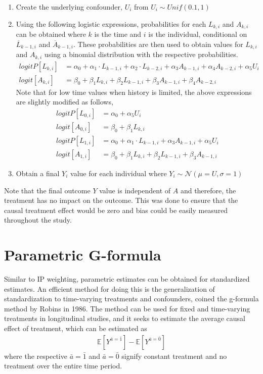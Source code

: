 \begin{enumerate}
\item Create the underlying confounder, $U_i$ from $U_i \sim Unif(0.1, 1)$ 
\item Using the following logistic expressions, probabilities for each $L_{k,i}$ and $A_{k,i}$ can be obtained where $k$ is the time and $i$ is the individual, conditional on $\overline{L}_{k-1,i}$ and $\overline{A}_{k-1,i}$.  These probabilities are then used to obtain values for $L_{k,i}$ and $A_{k,i}$ using a binomial distribution with the respective probabilities.  
\begin{align} 
logitP[L_{k,i}] &= \alpha_0 + \alpha_1 \cdot L_{k-1,i} + \alpha_2 \cdot L_{k-2,i} + \alpha_3 A_{k-1,i} + \alpha_4 A_{k-2,i} + \alpha_5 U_i\\ 
logit[A_{k,i}] &= \beta_0 + \beta_1 L_{k,i} + \beta_2 L_{k-1,i} + \beta_3 A_{k-1,i} + \beta_4 A_{k-2,i}
\end{align} 
Note that for low time values when history is limited, the above expressions are slightly modified as follows, 
\begin{align} 
logitP[L_{0,i}] &= \alpha_0 + \alpha_5 U_i\\ 
logit[A_{0,i}] &= \beta_0 + \beta_1 L_{k,i} \\
logitP[L_{1,i}] &= \alpha_0 + \alpha_1 \cdot L_{k-1,i} + \alpha_3 A_{k-1,i}  + \alpha_5 U_i\\ 
logit[A_{1,i}] &= \beta_0 + \beta_1 L_{k,i} + \beta_2 L_{k-1,i} + \beta_3 A_{k-1,i} 
\end{align} 
\item Obtain a final $Y_i$ value for each individual where $Y_i \sim \mathcal{N}(\mu = U, \sigma = 1)$ 
\end{enumerate} 

Note that the final outcome $Y$ value is independent of $A$ and therefore, the treatment has no impact on the outcome.  This was done to ensure that the causal treatment effect would be zero and bias could be easily measured throughout the study.  


\section{Parametric G-formula} 
Similar to IP weighting, parametric estimates can be obtained for standardized estimates.  An efficient method for doing this is the generalization of standardization to time-varying treatments and confounders, coined the g-formula method by Robins in 1986.\cite{robins1986new, wright2015international, hernan_robins_2016}  The method can be used for fixed and time-varying treatments in longitudinal studies, and it seeks to estimate the average causal effect of treatment, which can be estimated as 
\begin{align} 
\mathbb{E}[Y^{\bar{a} = \bar{1}}] - \mathbb{E}[Y^{\bar{a} = \bar{0}}] 
\end{align} 
where the respective $\bar{a} = \bar{1}$ and $\bar{a} = \bar{0}$ signify constant treatment and no treatment over the entire time period.  

